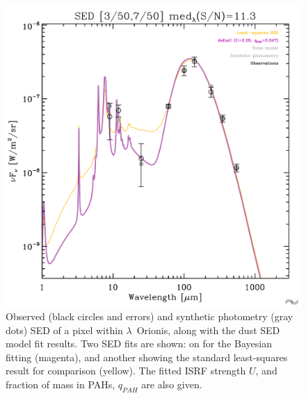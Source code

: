               \begin{figure}
                \includegraphics[width=\textwidth]{../Plots/ch_lori/fred_LOri_notes_Oct2017_fig1a.pdf}
                \centering
                \caption{Observed (black circles and errors) and synthetic photometry (gray dots) SED of a pixel within $\lambda$~Orionis, along with the dust SED model fit results. Two SED fits are shown: on for the Bayesian fitting (magenta), and another showing the standard least-squares result for comparison (yellow). The fitted ISRF strength $U$, and fraction of mass in PAHs, $q_{PAH}$ are also given.}
                \label{fig:fred_LOri_notes_Oct2017_fig1a}
              \end{figure}
